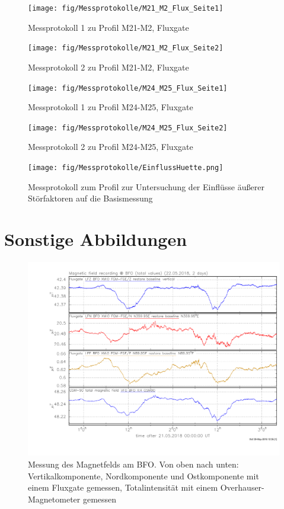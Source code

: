 \begin{figure}[!ht]
 \centering
 \texttt{[image: fig/Messprotokolle/M21\_M2\_Flux\_Seite1]}
 \caption{Messprotokoll 1 zu Profil M21-M2, Fluxgate}
\end{figure}

\begin{figure}[!ht]
 \centering
 \texttt{[image: fig/Messprotokolle/M21\_M2\_Flux\_Seite2]}
 \caption{Messprotokoll 2 zu Profil M21-M2, Fluxgate}
\end{figure}

\begin{figure}[!ht]
 \centering
 \texttt{[image: fig/Messprotokolle/M24\_M25\_Flux\_Seite1]}
 \caption{Messprotokoll 1 zu Profil M24-M25, Fluxgate}
\end{figure}

\begin{figure}[!ht]
 \centering
 \texttt{[image: fig/Messprotokolle/M24\_M25\_Flux\_Seite2]}
 \caption{Messprotokoll 2 zu Profil M24-M25, Fluxgate}
 \label{fig:MPProfil_letztes}
\end{figure}


\begin{figure}[!ht]
 \centering
 \texttt{[image: fig/Messprotokolle/EinflussHuette.png]}
 \caption{Messprotokoll zum Profil zur Untersuchung der Einflüsse äußerer Störfaktoren auf die Basismessung}
 \label{fig:MPHuette}
\end{figure}


\FloatBarrier
\section{Sonstige Abbildungen} %

\begin{figure}[!ht]
 \centering
 \includegraphics[width=\textwidth]{fig/Magnetfeld_BFO_2_Tage.pdf}
 \caption[Messung des Magnetfelds am BFO]{Messung des Magnetfelds am BFO. Von oben nach unten: Vertikalkomponente, Nordkomponente und Ostkomponente mit einem Fluxgate gemessen, Totalintensität mit einem Overhauser-Magnetometer gemessen}
 \label{fig:BFO}
\end{figure}

